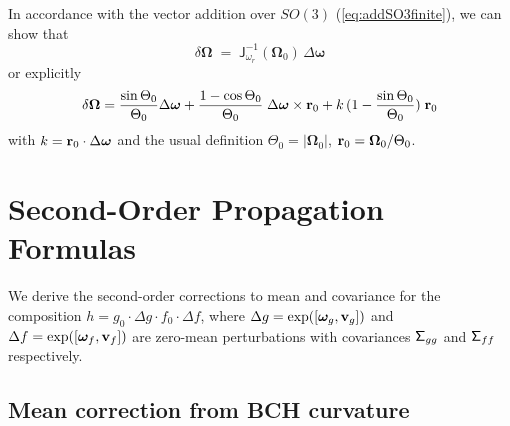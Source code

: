 \documentclass[journal]{IEEEtran}
\newcommand{\bfomega}{\boldsymbol{\omega}}
\newcommand{\bfOmega}{\boldsymbol{\Omega}}
\newcommand{\sfSigma}[1]{\mathsf{\Sigma}_\mathnormal{#1}}
\newcommand{\beq}{\begin{equation}}
\newcommand{\eeq}{\end{equation}}
\begin{document}
In accordance with the vector addition over $SO(3)$ (\ref{eq:addSO3finite}), we can show that
\beq
     \delta\bfOmega \; = \; \mathsf{J}^{-1}_{\omega_r}(\bfOmega_0)\, \Delta\bfomega
    \label{eq:SO3localglobal}
\eeq
or explicitly
\beq
    \delta{\bfOmega}=
    {\sin\Theta_0\over\Theta_0} \Delta\bfomega + {1-\cos\Theta_0\over\Theta_0}\; \Delta\bfomega\times{\bf r}_0 +
    k\,(1-{\sin\Theta_0\over\Theta_0}) \; {\bf r}_0
    \nonumber
\eeq
with $k={\bf r}_0\cdot\Delta\bfomega$ and the usual definition $\Theta_0=|\bfOmega_0|$,
${\bf r}_0 = \bfOmega_0/\Theta_0$.

\section{Second-Order Propagation Formulas}
\label{app:secondorder}

We derive the second-order corrections to mean and covariance 
for the composition $h = g_0 \cdot \Delta g \cdot f_0 \cdot \Delta f$,
where $\Delta g = \exp([\bfomega_g, {\bf v}_g])$ and 
$\Delta f = \exp([\bfomega_f, {\bf v}_f])$ are zero-mean 
perturbations with covariances $\sfSigma{gg}$ and $\sfSigma{ff}$ respectively.

\subsection{Mean correction from BCH curvature}
\end{document}
